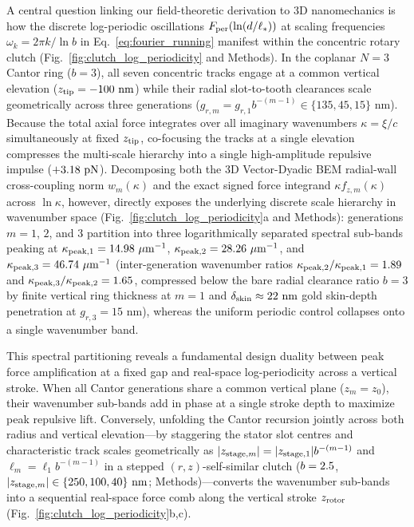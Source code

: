 \documentclass[pdflatex,sn-nature]{sn-jnl}
\DeclareRobustCommand{\roundtwo}[1]{\fpeval{round(#1,2)}}
\begin{document}
A central question linking our field-theoretic derivation to 3D nanomechanics is how the discrete log-periodic oscillations $F_{\rm per}(\ln(d/\ell_*))$ at scaling frequencies $\omega_k = 2\pi k / \ln b$ in Eq.~\eqref{eq:fourier_running} manifest within the concentric rotary clutch (Fig.~\ref{fig:clutch_log_periodicity} and Methods). In the coplanar $N=3$ Cantor ring ($b=3$), all seven concentric tracks engage at a common vertical elevation ($z_{\rm tip} = -100\text{ nm}$) while their radial slot-to-tooth clearances scale geometrically across three generations ($g_{r,m} = g_{r,1} b^{-(m-1)} \in \{135, 45, 15\}\text{ nm}$). Because the total axial force integrates over all imaginary wavenumbers $\kappa = \xi/c$ simultaneously at fixed $z_{\rm tip}$, co-focusing the tracks at a single elevation compresses the multi-scale hierarchy into a single high-amplitude repulsive impulse ($+\roundtwo{\FractalNthreeCantorseventrackBemThetathreeFZPn}\text{ pN}$). Decomposing both the 3D Vector-Dyadic BEM radial-wall cross-coupling norm $w_m(\kappa)$ and the exact signed force integrand $\kappa f_{z,m}(\kappa)$ across $\ln\kappa$, however, directly exposes the underlying discrete scale hierarchy in wavenumber space (Fig.~\ref{fig:clutch_log_periodicity}a and Methods): generations $m=1$, $2$, and $3$ partition into three logarithmically separated spectral sub-bands peaking at $\kappa_{{\rm peak},1} = \roundtwo{\LogperKPeakLoneUmInv}\ \mu\text{m}^{-1}$, $\kappa_{{\rm peak},2} = \roundtwo{\LogperKPeakLtwoUmInv}\ \mu\text{m}^{-1}$, and $\kappa_{{\rm peak},3} = \roundtwo{\LogperKPeakLthreeUmInv}\ \mu\text{m}^{-1}$ (inter-generation wavenumber ratios $\kappa_{{\rm peak},2}/\kappa_{{\rm peak},1} = \roundtwo{\LogperKPeakRatioTwoone}$ and $\kappa_{{\rm peak},3}/\kappa_{{\rm peak},2} = \roundtwo{\LogperKPeakRatioThreetwo}$, compressed below the bare radial clearance ratio $b=3$ by finite vertical ring thickness at $m=1$ and $\delta_{\rm skin} \approx 22\text{ nm}$ gold skin-depth penetration at $g_{r,3} = 15\text{ nm}$), whereas the uniform periodic control collapses onto a single wavenumber band.

This spectral partitioning reveals a fundamental design duality between peak force amplification at a fixed gap and real-space log-periodicity across a vertical stroke. When all Cantor generations share a common vertical plane ($z_m = z_0$), their wavenumber sub-bands add in phase at a single stroke depth to maximize peak repulsive lift. Conversely, unfolding the Cantor recursion jointly across both radius and vertical elevation---by staggering the stator slot centres and characteristic track scales geometrically as $|z_{{\rm stage},m}| = |z_{{\rm stage},1}| b^{-(m-1)}$ and $\ell_m = \ell_1 b^{-(m-1)}$ in a stepped $(r,z)$-self-similar clutch ($b=2.5{}$, $|z_{{\rm stage},m}| \in \{250, 100, 40\}\text{ nm}$; Methods)---converts the wavenumber sub-bands into a sequential real-space force comb along the vertical stroke $z_{\rm rotor}$ (Fig.~\ref{fig:clutch_log_periodicity}b,c).
\end{document}
